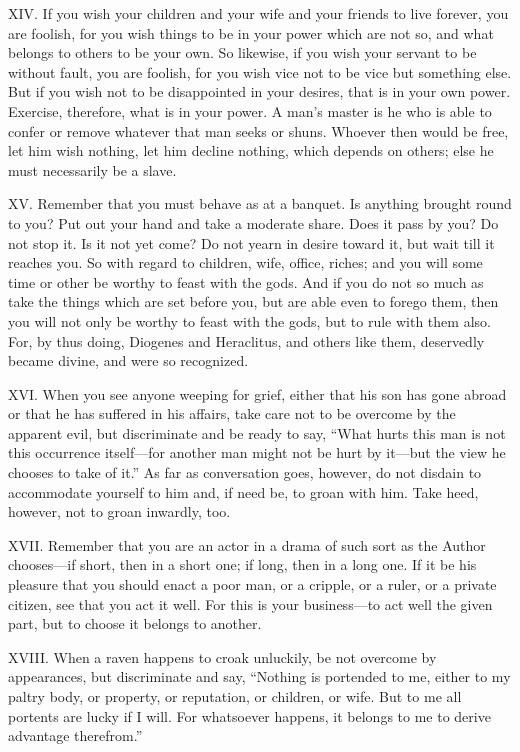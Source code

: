 \documentclass[a4paper]{article}
\begin{document}
XIV. If you wish your children and your wife and your friends to live forever,
you are foolish, for you wish things to be in your power which are not
so, and what belongs to others to be your own. So likewise, if you wish
your servant to be without fault, you are foolish, for you wish vice not
to be vice but something else. But if you wish not to be disappointed in
your desires, that is in your own power. Exercise, therefore, what is in
your power. A man’s master is he who is able to confer or remove whatever
that man seeks or shuns. Whoever then would be free, let him wish
nothing, let him decline nothing, which depends on others; else he must
necessarily be a slave.


XV. Remember that you must behave as at a banquet. Is anything brought round
to you? Put out your hand and take a moderate share. Does it pass by you?
Do not stop it. Is it not yet come? Do not yearn in desire toward it, but
wait till it reaches you. So with regard to children, wife, office,
riches; and you will some time or other be worthy to feast with the gods.
And if you do not so much as take the things which are set before you,
but are able even to forego them, then you will not only be worthy to
feast with the gods, but to rule with them also. For, by thus doing,
Diogenes and Heraclitus, and others like them, deservedly became divine,
and were so recognized.


XVI. When you see anyone weeping for grief, either that his son has gone
abroad or that he has suffered in his affairs, take care not to be
overcome by the apparent evil, but discriminate and be ready to say,
“What hurts this man is not this occurrence itself—for another man might
not be hurt by it—but the view he chooses to take of it.” As far as
conversation goes, however, do not disdain to accommodate yourself to him
and, if need be, to groan with him. Take heed, however, not to groan
inwardly, too.


XVII. Remember that you are an actor in a drama of such sort as the Author
chooses—if short, then in a short one; if long, then in a long one. If it
be his pleasure that you should enact a poor man, or a cripple, or a
ruler, or a private citizen, see that you act it well. For this is your
business—to act well the given part, but to choose it belongs to another.


XVIII. When a raven happens to croak unluckily, be not overcome by appearances,
but discriminate and say, “Nothing is portended to me, either to my
paltry body, or property, or reputation, or children, or wife. But to
me all portents are lucky if I will. For whatsoever happens, it belongs
to me to derive advantage therefrom.”
\end{document}

